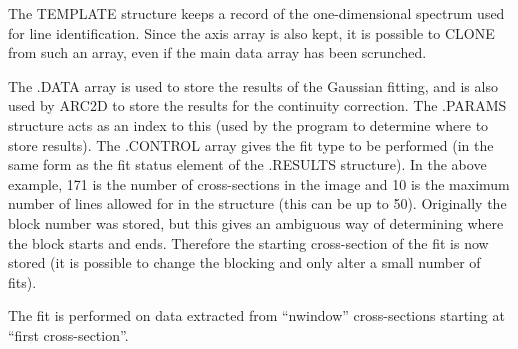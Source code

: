 The TEMPLATE structure keeps a record of the one-dimensional spectrum
used for line identification.
Since the axis array is also kept, it is possible to CLONE from such an
array, even if the main data array has been scrunched.

The .DATA array is used to store the results of the Gaussian fitting,
and is also used by ARC2D to store the results for the continuity
correction. The .PARAMS structure acts as an index to this (used by the
program to determine where to store results).
The .CONTROL array gives the fit type to be performed (in the same form
as the fit status element of the .RESULTS structure).
In the
above example, 171 is the number of cross-sections in the image and 10
is the maximum number of lines allowed for in the structure (this can
be up to 50). Originally the block number was stored, but this gives an
ambiguous way of determining where the block starts and ends. Therefore
the starting cross-section of the fit is now stored (it is possible to
change the blocking and only alter a small number of fits).

The fit is performed on data extracted from ``nwindow'' cross-sections 
starting at ``first cross-section''.

